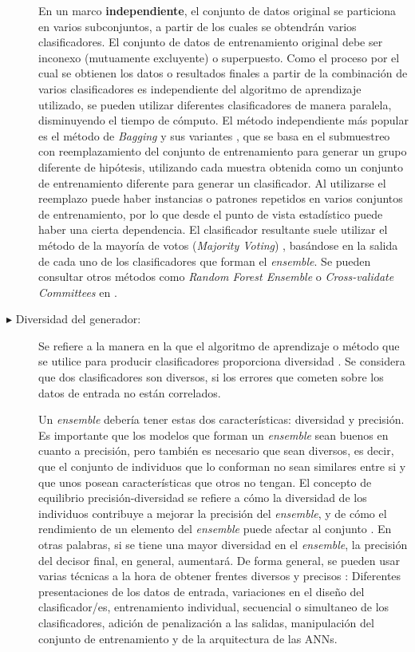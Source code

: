 \begin{description}
En un marco \textbf{independiente}, el conjunto de datos original se particiona en varios
subconjuntos, a partir de los cuales se obtendrán varios clasificadores. El conjunto de
datos de entrenamiento original debe ser inconexo (mutuamente excluyente) o superpuesto.
Como el proceso por el cual se obtienen los datos o resultados finales a partir de la
combinación de varios clasificadores es independiente del algoritmo de aprendizaje
utilizado, se pueden utilizar diferentes clasificadores de manera paralela, disminuyendo
el tiempo de cómputo. El método independiente más popular es el método de \textit{Bagging}
\cite{Breiman1996} y sus variantes \cite{Rokach2009}, que se  basa en el submuestreo con
reemplazamiento del conjunto de entrenamiento para generar un grupo diferente de
hipótesis,
utilizando cada muestra obtenida como un conjunto de entrenamiento diferente para generar
un clasificador. Al utilizarse el reemplazo puede haber instancias o patrones repetidos en
varios conjuntos de entrenamiento, por lo que desde el punto de vista estadístico puede
haber una cierta dependencia. El clasificador resultante suele utilizar el método de la
mayoría de votos (\textit{Majority Voting}) \cite{Theodoridis2006}, basándose en la salida
de cada uno de los clasificadores que forman el \textit{ensemble}. Se pueden
consultar otros métodos como \textit{Random Forest Ensemble} o \textit{Cross-validate
Committees} en \cite{Rokach2009}.
\item[$\blacktriangleright$ Diversidad del generador:] Se refiere a la manera en la que el
algoritmo de
aprendizaje o método que se utilice para producir clasificadores proporciona diversidad
\cite{Chandra2006,Kuncheva2005,Chandra2004,Chandra2006b}. Se considera que dos
clasificadores son diversos, si los errores que cometen sobre los datos de entrada no
están correlados.

Un \textit{ensemble} debería tener estas dos características: diversidad y precisión. Es
importante que los modelos que forman un \textit{ensemble} sean buenos en cuanto a
precisión, pero
también es necesario que sean diversos, es decir, que el conjunto de individuos que lo
conforman no sean similares entre si y que unos posean características que otros no
tengan. El concepto de equilibrio precisión-diversidad se refiere a
cómo la diversidad de los individuos contribuye a mejorar la precisión del
\textit{ensemble}, y de cómo el rendimiento de un elemento del \textit{ensemble} puede
afectar al conjunto \cite{Chandra2004}. En otras palabras, si se tiene una mayor
diversidad en el \textit{ensemble}, la precisión del decisor final, en general,
aumentará. De forma general, se pueden usar varias técnicas a la
hora de obtener frentes diversos y precisos \cite{Rokach2009,Brown2005,Sharkey1999}:
Diferentes presentaciones de los datos de entrada, variaciones en el diseño del
clasificador/es, entrenamiento individual, secuencial o simultaneo de los clasificadores,
adición de penalización a las salidas, manipulación del conjunto de entrenamiento y de la
arquitectura de las ANNs.


\end{description}
